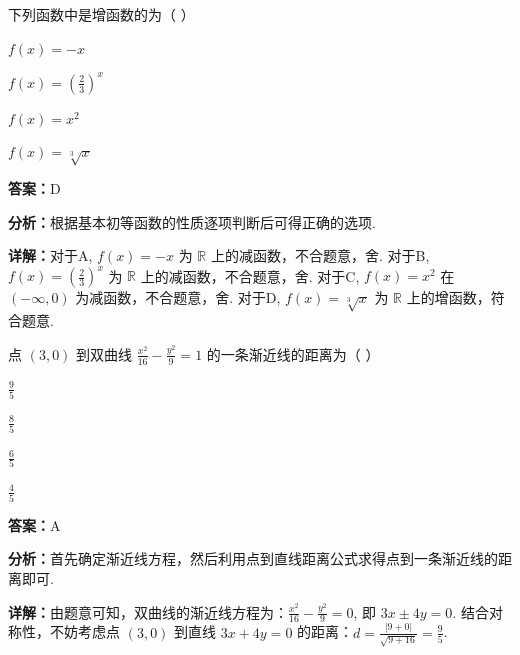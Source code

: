 \begin{question}[points=5]
下列函数中是增函数的为（ ）
\begin{choices}
  \item $f(x) = -x$
  \item $f(x) = \left(\frac{2}{3}\right)^x$
  \item $f(x) = x^2$
  \item $f(x) = \sqrt[3]{x}$
\end{choices}
\begin{solution}
\textbf{答案：}D

\textbf{分析：}根据基本初等函数的性质逐项判断后可得正确的选项.

\textbf{详解：}对于A, $f(x)=-x$ 为 $\mathbb{R}$ 上的减函数，不合题意，舍.
对于B, $f(x)=\left(\frac{2}{3}\right)^x$ 为 $\mathbb{R}$ 上的减函数，不合题意，舍.
对于C, $f(x)=x^2$ 在 $(-\infty,0)$ 为减函数，不合题意，舍.
对于D, $f(x)=\sqrt[3]{x}$ 为 $\mathbb{R}$ 上的增函数，符合题意.
\end{solution}
\end{question}

\begin{question}[points=5]
点 $(3,0)$ 到双曲线 $\frac{x^2}{16} - \frac{y^2}{9} = 1$ 的一条渐近线的距离为（ ）
\begin{choices}
  \item $\frac{9}{5}$
  \item $\frac{8}{5}$
  \item $\frac{6}{5}$
  \item $\frac{4}{5}$
\end{choices}
\begin{solution}
\textbf{答案：}A

\textbf{分析：}首先确定渐近线方程，然后利用点到直线距离公式求得点到一条渐近线的距离即可.

\textbf{详解：}由题意可知，双曲线的渐近线方程为：$\frac{x^2}{16} - \frac{y^2}{9} = 0$, 即 $3x \pm 4y = 0$. 结合对称性，不妨考虑点 $(3,0)$ 到直线 $3x+4y=0$ 的距离：$d = \frac{|9+0|}{\sqrt{9+16}} = \frac{9}{5}$.
\end{solution}
\end{question}

